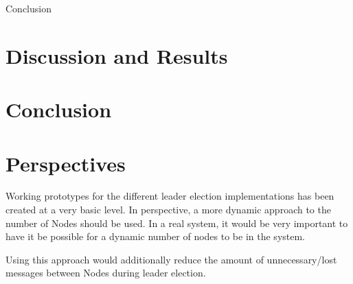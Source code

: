 {Conclusion}
\section{Discussion and Results}

\section{Conclusion}

\section{Perspectives}
Working prototypes for the different leader election implementations has been created at a very basic level. In perspective, a more dynamic approach to the number of Nodes should be used. In a real system, it would be very important to have it be possible for a dynamic number of nodes to be in the system. 

Using this approach would additionally reduce the amount of unnecessary/lost messages between Nodes during leader election. 